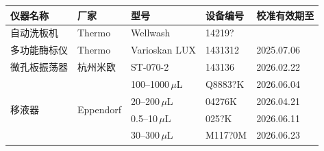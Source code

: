 \documentclass[UTF8,10pt,a4paper,fontset=fandol]{ctexart}
\newcommand{\fieldvalue}[1]{#1}
\newcommand{\handwritten}[1]{#1}
\begin{document}
\begin{tabularx}{\textwidth}{|p{2.7cm}|p{2.5cm}|p{2.5cm}|p{2.5cm}|X|}
\hline
仪器名称 & 厂家 & 型号 & 设备编号 & 校准有效期至 \\
\hline
自动洗板机 & Thermo & Wellwash &
\fieldvalue{\handwritten{14219?}} &
\fieldvalue{\handwritten{\checkmark}} \\
\hline
多功能酶标仪 & Thermo & Varioskan LUX &
\fieldvalue{\handwritten{1431312}} &
\fieldvalue{\handwritten{2025.07.06}} \\
\hline
微孔板振荡器 & 杭州米欧 & ST-070-2 &
\fieldvalue{\handwritten{143136}} &
\fieldvalue{\handwritten{2026.02.22}} \\
\hline
\multirow{4}{*}{移液器} & \multirow{4}{*}{Eppendorf} &
\fieldvalue{\handwritten{100--1000\,$\mu$L}} &
\fieldvalue{\handwritten{Q8883?K}} &
\fieldvalue{\handwritten{2026.06.04}} \\
\cline{3-5}
& &
\fieldvalue{\handwritten{20--200\,$\mu$L}} &
\fieldvalue{\handwritten{04276K}} &
\fieldvalue{\handwritten{2026.04.21}} \\
\cline{3-5}
& &
\fieldvalue{\handwritten{0.5--10\,$\mu$L}} &
\fieldvalue{\handwritten{025?K}} &
\fieldvalue{\handwritten{2026.06.11}} \\
\cline{3-5}
& &
\fieldvalue{\handwritten{30--300\,$\mu$L}} &
\fieldvalue{\handwritten{M117?0M}} &
\fieldvalue{\handwritten{2026.06.23}} \\
\hline
\end{tabularx}
\end{document}

